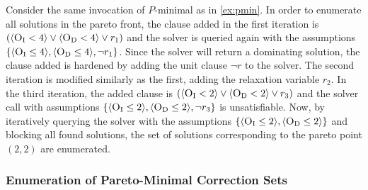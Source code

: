\begin{example}
  Consider the same invocation of $P$-minimal as in \cref{ex:pmin}.
  In order to enumerate all solutions in the pareto front, the clause added in the first iteration is $(\langle \textsc{O}_{\text{I}} < 4 \rangle \lor \langle \textsc{O}_{\text{D}} < 4 \rangle \lor r_1)$ and the solver is queried again with the assumptions $\{ \langle \textsc{O}_{\text{I}} \leq 4 \rangle, \langle \textsc{O}_{\text{D}} \leq 4 \rangle, \lnot r_1 \}$.
  Since the solver will return a dominating solution, the clause added is hardened by adding the unit clause $\lnot r$ to the solver.
  The second iteration is modified similarly as the first, adding the relaxation variable $r_2$.
  In the third iteration, the added clause is $(\langle \textsc{O}_{\text{I}} < 2 \rangle \lor \langle \textsc{O}_{\text{D}} < 2 \rangle \lor r_3)$ and the solver call with assumptions $\{ \langle \textsc{O}_{\text{I}} \leq 2 \rangle, \langle \textsc{O}_{\text{D}} \leq 2 \rangle, \lnot r_3 \}$ is unsatisfiable.
  Now, by iteratively querying the solver with the assumptions $\{ \langle \textsc{O}_{\text{I}} \leq 2 \rangle, \langle \textsc{O}_{\text{D}} \leq 2 \rangle \}$ and blocking all found solutions, the set of solutions corresponding to the pareto point $(2,2)$ are enumerated.
\end{example}

\subsubsection{Enumeration of Pareto-Minimal Correction Sets\label{sec:pareto-mcs}}

